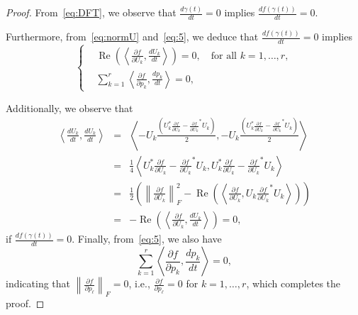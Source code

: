 \documentclass[10pt,a4paper]{amsart}
\begin{document}
    \begin{proof}
    From~\eqref{eq:DFT}, we observe that $\frac{d\gamma(t)}{dt} = 0$ implies $\frac{df(\gamma(t))}{dt} = 0$. 
    
    Furthermore, from~\eqref{eq:normU} and~\eqref{eq:5}, we deduce that 
    $\frac{df(\gamma(t))}{dt} = 0$ implies 
    \begin{equation} \label{eq:eq1}
    \left\{
    \begin{aligned}
      & \operatorname{Re}\left(
      \left\langle
    \frac{\partial f}{\partial U_k}, \frac{d U_k}{dt}
      \right\rangle
      \right) = 0, \quad \text{for all } k=1, \ldots, r, \\ 
      &   \sum_{k=1}^r 
      \left\langle
    \frac{\partial f}{\partial p_k}, \frac{d p_k}{dt}
      \right\rangle = 0,
    \end{aligned}
    \right.
    \end{equation}
    
    Additionally, we observe that
    \begin{eqnarray}\label{eq:normdudt}  
    \left\langle \frac{d U_k}{dt},
    \frac{d U_k}{dt}
    \right\rangle            
    &=& 
    \left\langle -
     U_k \frac{\left( U_k^* 
    \frac{\partial f}{\partial U_k} -  
    {\frac{\partial f}{\partial U_k}}^* U_k 
    \right)}{2}, -
     U_k \frac{\left( U_k^* 
    \frac{\partial f}{\partial U_k} -  
    {\frac{\partial f}{\partial U_k}}^* U_k 
    \right)}{2} \right\rangle
    \nonumber\\  
    &=&
    \frac{1}{4}
    \left\langle 
     U_k^*
    \frac{\partial f}{\partial U_k} -  
    {\frac{\partial f}{\partial U_k}}^* U_k, 
    U_k^* 
    \frac{\partial f}{\partial U_k} -  
    {\frac{\partial f}{\partial U_k}}^* U_k 
     \right\rangle \nonumber\\
    &=&
    \frac{1}{2}
    \left(
    \left\|\frac{\partial f}{\partial U_k}
    \right\|_F^2 - \operatorname{Re}\left(\left\langle 
    \frac{\partial f}{\partial U_k}, U_k 
    {\frac{\partial f}{\partial U_k}}^* U_k  
     \right\rangle
    \right)
    \right)
     \nonumber\\ 
     &=& - \operatorname{Re}
     \left(\left\langle 
    \frac{\partial f}{\partial U_k}, 
    \frac{dU_k}{dt}   
     \right\rangle
    \right) = 0,
    \end{eqnarray}
    if $\frac{df(\gamma(t))}{dt} = 0$.
    Finally, from~\eqref{eq:5}, we also have 
    \[
    \sum_{k=1}^r 
      \left\langle
    \frac{\partial f}{\partial p_k}, \frac{d p_k}{dt}
      \right\rangle = 0,
    \]
    indicating that $\left\|\frac{\partial f}{\partial p_\ell}\right\|_F = 0$, i.e., $\frac{\partial f}{\partial p_\ell} = 0$ for $k=1, \ldots, r$, which completes the proof.
    \end{proof}
\end{document}
